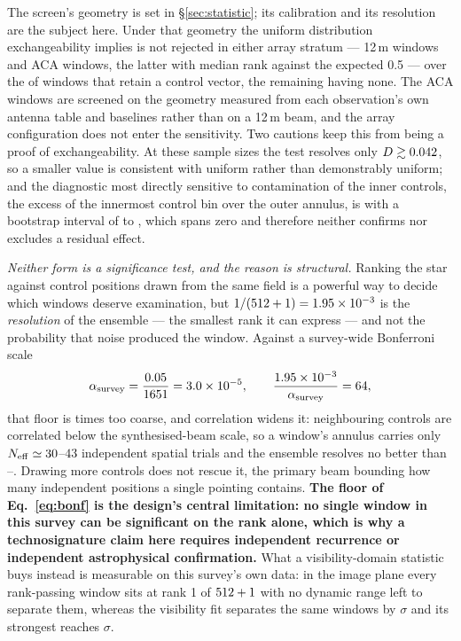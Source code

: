 The screen's geometry is set in \S\ref{sec:statistic}; its calibration and
its resolution are the subject here. Under that geometry the uniform
distribution exchangeability implies is not rejected in either array stratum
--- \VerTwmAfterN{} 12\,m windows and \VerAcaAfterN{} ACA windows, the
latter with median rank \VerAcaAfterMed{} against the expected 0.5 --- over
the \VerNTested{} of \NWindows{} windows that retain a control vector, the
remaining \VerNUnmatched{} having none. The ACA windows are screened on the
geometry measured from each observation's own antenna table and baselines
rather than on a 12\,m beam, and the array configuration does not enter the
sensitivity. Two cautions keep this from being a proof of exchangeability.
At these sample sizes the test resolves only $D\gtrsim0.042$, so a
smaller value is consistent with uniform rather than demonstrably uniform;
and the diagnostic most directly sensitive to contamination of the inner
controls, the excess of the innermost control bin over the outer annulus, is
\VerAcaAfterExc{} with a bootstrap interval of \VerAcaAfterExcLo{} to
\VerAcaAfterExcHi, which spans zero and therefore neither confirms nor
excludes a residual effect.

\emph{Neither form is a significance test, and the reason is structural.}
Ranking the star against \NCtrl{} control positions drawn from the same field
is a powerful way to decide which windows deserve examination, but
$1/(512+1)=1.95\times10^{-3}$ is the \emph{resolution} of the ensemble --- the
smallest rank it can express --- and not the probability that noise produced
the window. Against a survey-wide Bonferroni scale
%
\begin{equation}
\alpha_{\rm survey}=\frac{0.05}{\NWindows}=\BonfScaleCalc,
\qquad
\frac{\RankFloorVal}{\alpha_{\rm survey}}=\BonfRankRatio,
\label{eq:bonf}
\end{equation}
%
that floor is \BonfRankRatio{} times too coarse, and correlation widens it:
neighbouring controls are correlated below the synthesised-beam scale, so a
window's annulus carries only $N_{\rm eff}\simeq30$--$43$ independent spatial
trials and the ensemble resolves no better than \RankEffLo--\RankEffHi.
Drawing more controls does not rescue it, the primary beam bounding how many
independent positions a single pointing contains. \textbf{The floor of
Eq.~\ref{eq:bonf} is the design's central limitation: no single window in this survey can be
significant on the rank alone, which is why a technosignature claim here
requires independent recurrence or independent astrophysical confirmation.}
What a visibility-domain statistic buys instead is measurable on this survey's
own data: in the image plane every rank-passing window sits at rank 1 of
$512+1$ with no dynamic range left to separate them, whereas the
visibility fit separates the same windows by \VgSep$\sigma$ and its strongest
reaches \VgVisMax$\sigma$.

